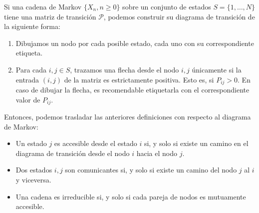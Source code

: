 Si una cadena de Markov $\{X_n,n\geq 0\}$ sobre un conjunto de estados $S=\{1,\dots,N\}$ tiene una matriz de transición $\mathcal P$, podemos construir su diagrama de transición de la siguiente forma:
\begin{enumerate}
    \item Dibujamos un nodo por cada posible estado, cada uno con su correspondiente etiqueta.
    \item Para cada $i,j\in S$, trazamos una flecha desde el nodo $i,j$ únicamente si la entrada $(i,j)$ de la matriz es estrictamente positiva. Esto es, si $P_{ij}>0$. En caso de dibujar la flecha, es recomendable etiquetarla con el correspondiente valor de $P_{ij}$.
\end{enumerate} 
Entonces, podemos trasladar las anteriores definiciones con respecto al diagrama de Markov:
\begin{itemize}
    \item Un estado $j$ es accesible desde el estado $i$ si, y solo si existe un camino en el diagrama de transición desde el nodo $i$ hacia el nodo $j$.
    \item Dos estados $i,j$ son comunicantes si, y solo si existe un camino del nodo $j$ al $i$ y viceversa.
    \item Una cadena es irreducible si, y solo si cada pareja de nodos es mutuamente accesible.
\end{itemize}

